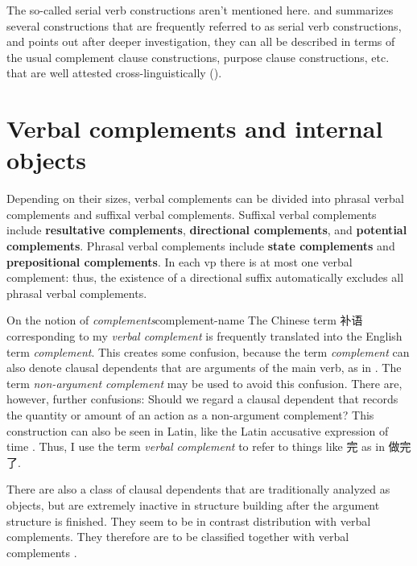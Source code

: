 \documentclass[UTF8, a4paper, oneside, scheme=plain]{ctexrep}
\newcommand*{\citesec}[1]{\S~{#1}}
\newcommand*{\citepages}[1]{pp.~{#1}}
\newcommand*{\concept}[1]{\textbf{#1}}
\newcommand*{\term}[1]{\emph{#1}}
\begin{document}
The so-called serial verb constructions aren't mentioned here.
\citet{paul2008serial} and \citet[\citesec{9.4}]{deng2010formal} 
summarizes several constructions that are
frequently referred to as serial verb constructions,
and points out after deeper investigation,
they can all be described in terms of the usual complement clause constructions,
purpose clause constructions, etc. 
that are well attested cross-linguistically ().


\section{Verbal complements and internal objects}\label{sec:verbal-complement}

Depending on their sizes, 
verbal complements can be divided into 
phrasal verbal complements 
and suffixal verbal complements. 
Suffixal verbal complements 
include \concept{resultative complements}, 
\concept{directional complements}, 
and \concept{potential complements}. 
Phrasal verbal complements include \concept{state complements} and 
\concept{prepositional complements}.
In each \acs{vp} there is at most one verbal complement: 
thus, the existence of a directional suffix
automatically excludes all phrasal verbal complements.

\begin{infobox}{On the notion of \term{complements}}{complement-name}
    The Chinese term 补语 corresponding to my \term{verbal complement}
    is frequently translated into the English term \term{complement}.
    This creates some confusion,
    because the term \term{complement} can also denote 
    clausal dependents that are arguments of the main verb, as in \citet{cgel}.
    The term \term{non-argument complement} may be used to avoid this confusion.
    There are, however, further confusions:
    Should we regard a clausal dependent that records the quantity or amount of an action 
    as a non-argument complement?
    This construction can also be seen in Latin, 
    like the Latin accusative expression of time \citep[\citesec{423}]{greenough2013allen}.
    Thus, I use the term \term{verbal complement} to refer to 
    things like 完 as in 做完了.
\end{infobox}

There are also a class of clausal dependents 
that are traditionally analyzed as objects,
but are extremely inactive in structure building 
after the argument structure is finished.
They seem to be in contrast distribution with verbal complements.
They therefore are to be classified together with verbal complements
\citep[\citepages{188-190}]{deng2010formal}.
\end{document}
